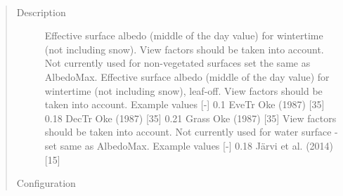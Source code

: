 \documentclass[letterpaper,10pt,english]{sphinxmanual}
\begin{document}

\begin{fulllineitems}
\label{\detokenize{input_files/SUEWS_SiteInfo/Input_Options:cmdoption-arg-albedomin}}~\begin{quote}\begin{description}
\item[{Description}] \leavevmode
Effective surface albedo (middle of the day value) for wintertime (not including snow). View factors should be taken into account. Not currently used for non-vegetated surfaces \textendash{} set the same as AlbedoMax. Effective surface albedo (middle of the day value) for wintertime (not including snow), leaf-off. View factors should be taken into account. Example values {[}-{]} 0.1 EveTr Oke (1987) {[}35{]}  0.18 DecTr Oke (1987) {[}35{]}  0.21 Grass Oke (1987) {[}35{]}  View factors should be taken into account. Not currently used for water surface - set same as AlbedoMax. Example values {[}-{]} 0.18 Järvi et al. (2014) {[}15{]}

\item[{Configuration}] \leavevmode


\end{description}
\end{quote}
\end{fulllineitems}
\end{document}
